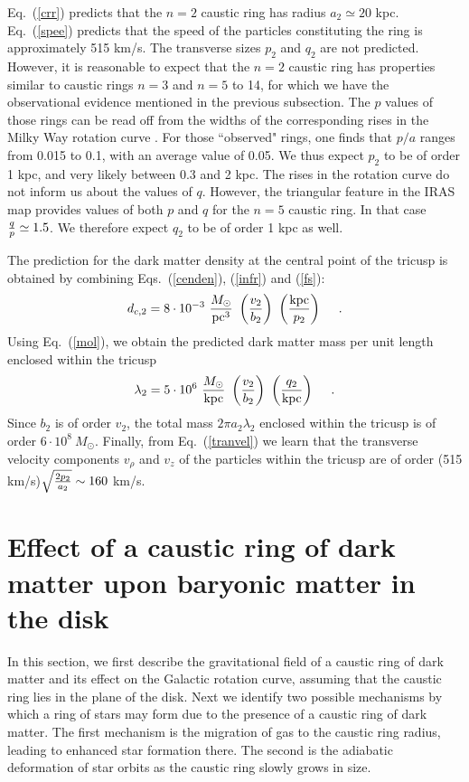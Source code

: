 \documentclass[aps,prd,preprint,tightenlines,floatfix,showpacs,groupedaddress]{revtex4}
\begin{document}
Eq.~(\ref{crr}) predicts that the $n=2$ caustic ring has radius
$a_2 \simeq 20$ kpc.  Eq.~(\ref{spee}) predicts that the speed 
of the particles constituting the ring is approximately 515 km/s.  
The transverse sizes $p_2$ and $q_2$ are not predicted.  However, 
it is reasonable to expect that the $n=2$ caustic ring has properties 
similar to caustic rings $n=3$ and $n=5$ to 14, for which we have 
the observational evidence mentioned in the previous subsection. 
The $p$ values of those rings can be read off from the widths of 
the corresponding rises in the Milky Way rotation curve \cite{milk}.  
For those ``observed" rings, one finds that $p/a$ ranges from 0.015 
to 0.1, with an average value of 0.05.  We thus expect $p_2$ to be 
of order 1 kpc, and very likely between 0.3 and 2 kpc.  The rises 
in the rotation curve do not inform us about the values of $q$.  
However, the triangular feature in the IRAS map provides values 
of both $p$ and $q$ for the $n = 5$ caustic ring. In that case 
${q \over p} \simeq 1.5$. We therefore expect $q_2$ to be of 
order 1 kpc as well.  

The prediction for the dark matter density at the central point 
of the tricusp is obtained by combining Eqs.~(\ref{cenden}), 
(\ref{infr}) and (\ref{fs}):
\begin{equation}
d_{c,2} = 8 \cdot 10^{-3}~{M_\odot \over {\rm pc}^3}~
\left({v_2 \over b_2}\right)~
\left({{\rm kpc} \over p_2}\right)~~~\ .
\label{dc2}
\end{equation}
Using Eq.~(\ref{mol}), we obtain the predicted dark matter
mass per unit length enclosed within the tricusp 
\begin{equation}
\lambda_2 = 5 \cdot 10^6~{M_\odot \over {\rm kpc}}~
\left({v_2 \over b_2}\right)~
\left({q_2 \over {\rm kpc}}\right)~~~\ .
\label{mol2}
\end{equation}
Since $b_2$ is of order $v_2$, the total mass $2 \pi a_2 \lambda_2$
enclosed within the tricusp is of order $6 \cdot 10^8~M_\odot$.  
Finally, from Eq.~(\ref{tranvel}) we learn that the transverse 
velocity components $v_\rho$ and $v_z$ of the particles within 
the tricusp are of order (515 km/s)$\sqrt{2 p_2 \over a_2} \sim 160$
km/s.

\section{Effect of a caustic ring of dark matter upon baryonic 
matter in the disk} 

In this section, we first describe the gravitational field of 
a caustic ring of dark matter and its effect on the Galactic 
rotation curve, assuming that the caustic ring lies in the 
plane of the disk.  Next we identify two possible mechanisms
by which a ring of stars may form due to the presence of a 
caustic ring of dark matter.  The first mechanism is the 
migration of gas to the caustic ring radius, leading to 
enhanced star formation there.  The second is the adiabatic 
deformation of star orbits as the caustic ring slowly grows in 
size.
\end{document}

